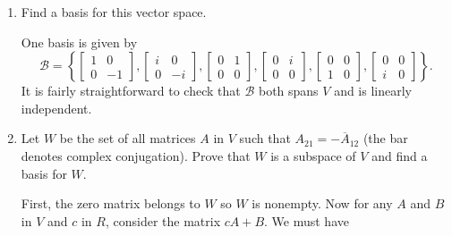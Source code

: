 \begin{enumerate}
\begin{proof}
    Finally, for any $A,B$ in $V$ and $c,d$ in $R$,
    \begin{equation*}
      1A = A, \quad c(dA) = (cd)A,
    \end{equation*}
    \begin{equation*}
      (c + d)A = cA + dA,
      \quad\text{and}\quad c(A + B) = cA + cB.
    \end{equation*}
    Therefore $V$ is a vector space.
  \end{proof}
\item Find a basis for this vector space.
  \begin{solution}
    One basis is given by
    \begin{equation*}
      \mathcal{B} =
      \left\{
        \begin{bmatrix}
          1 & 0 \\ 0 & -1
        \end{bmatrix},
        \begin{bmatrix}
          i & 0 \\ 0 & -i
        \end{bmatrix},
        \begin{bmatrix}
          0 & 1 \\ 0 & 0
        \end{bmatrix},
        \begin{bmatrix}
          0 & i \\ 0 & 0
        \end{bmatrix},
        \begin{bmatrix}
          0 & 0 \\ 1 & 0
        \end{bmatrix},
        \begin{bmatrix}
          0 & 0 \\ i & 0
        \end{bmatrix}
      \right\}.
    \end{equation*}
    It is fairly straightforward to check that $\mathcal{B}$ both
    spans $V$ and is linearly independent.
  \end{solution}
\item Let $W$ be the set of all matrices $A$ in $V$ such that
  $A_{21} = -\overline{A}_{12}$ (the bar denotes complex
  conjugation). Prove that $W$ is a subspace of $V$ and find a basis
  for $W$.
  \begin{solution}
    First, the zero matrix belongs to $W$ so $W$ is nonempty. Now for
    any $A$ and $B$ in $V$ and $c$ in $R$, consider the matrix
    $cA + B$. We must have

\end{solution}
\end{enumerate}
